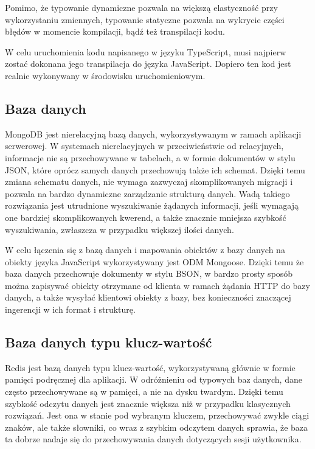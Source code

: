 \documentclass[a4paper,12pt,twoside,openany]{report}
\begin{document}
Pomimo, że typowanie dynamiczne pozwala na większą elastyczność przy wykorzystaniu zmiennych, typowanie statyczne pozwala na wykrycie części błędów w momencie kompilacji, bądź też transpilacji kodu.

W celu uruchomienia kodu napisanego w języku TypeScript, musi najpierw zostać dokonana jego transpilacja do języka JavaScript. Dopiero ten kod jest realnie wykonywany w środowisku uruchomieniowym.

\subsection{Baza danych}
MongoDB jest nierelacyjną bazą danych, wykorzystywanym w ramach aplikacji serwerowej. W systemach nierelacyjnych w przeciwieństwie od relacyjnych, informacje nie są przechowywane w tabelach, a w formie dokumentów w stylu JSON, które oprócz samych danych przechowują także ich schemat. Dzięki temu zmiana schematu danych, nie wymaga zazwyczaj skomplikowanych migracji i pozwala na bardzo dynamiczne zarządzanie strukturą danych. Wadą takiego rozwiązania jest utrudnione wyszukiwanie żądanych informacji, jeśli wymagają one bardziej skomplikowanych kwerend, a także znacznie mniejsza szybkość wyszukiwania, zwłaszcza w przypadku większej ilości danych. 

W celu łączenia się z bazą danych i mapowania obiektów z bazy danych na obiekty języka JavaScript wykorzystywany jest ODM Mongoose. Dzięki temu że baza danych przechowuje dokumenty w stylu BSON, w bardzo prosty sposób można zapisywać obiekty otrzymane od klienta w ramach żądania HTTP do bazy danych, a także wysyłać klientowi obiekty z bazy, bez konieczności znaczącej ingerencji w ich format i strukturę.

\subsection{Baza danych typu klucz-wartość}
Redis jest bazą danych typu klucz-wartość, wykorzystywaną głównie w formie pamięci podręcznej dla aplikacji. W odróżnieniu od typowych baz danych, dane często przechowywane są w pamięci, a nie na dysku twardym. Dzięki temu szybkość odczytu danych jest znacznie większa niż w przypadku klasycznych rozwiązań.
Jest ona w stanie pod wybranym kluczem, przechowywać zwykle ciągi znaków, ale także słowniki, co wraz z szybkim odczytem danych sprawia, że baza ta dobrze nadaje się do przechowywania danych dotyczących sesji użytkownika.
\end{document}
